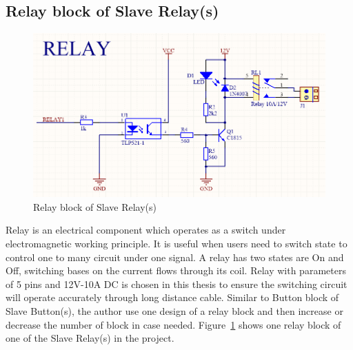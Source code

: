   \subsection{Relay block of Slave Relay(s)}
  \begin{figure}[!ht]
    \begin{center}
    \includegraphics[scale=0.65]{images/relay.png}
    \caption{Relay block of Slave Relay(s)}
    \label{fig:relayBlock}
    \end{center}
  \end{figure}
  Relay is an electrical component which operates as a switch under electromagnetic working principle. It is useful when users need to switch state to control one to many circuit under one signal. A relay has two states are On and Off, switching bases on the current flows through its coil. Relay with parameters of 5 pins and 12V-10A DC is chosen in this thesis to ensure the switching circuit will operate accurately through long distance cable. Similar to Button block of Slave Button(s), the author use one design of a relay block and then increase or decrease the number of block in case needed. Figure~\ref{fig:relayBlock} shows one relay block of one of the Slave Relay(s) in the project.

